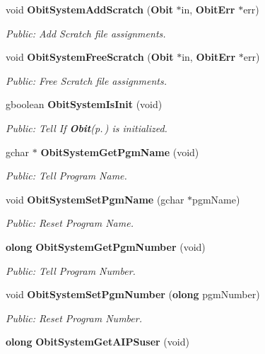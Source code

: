 \begin{CompactItemize}
void {\bf Obit\-System\-Add\-Scratch} ({\bf Obit} $\ast$in, {\bf Obit\-Err} $\ast$err)
\begin{CompactList}\small\item\em Public: Add Scratch file assignments. \item\end{CompactList}\item 
void {\bf Obit\-System\-Free\-Scratch} ({\bf Obit} $\ast$in, {\bf Obit\-Err} $\ast$err)
\begin{CompactList}\small\item\em Public: Free Scratch file assignments. \item\end{CompactList}\item 
gboolean {\bf Obit\-System\-Is\-Init} (void)
\begin{CompactList}\small\item\em Public: Tell If {\bf Obit}{\rm (p.\,\pageref{structObit})} is initialized. \item\end{CompactList}\item 
gchar $\ast$ {\bf Obit\-System\-Get\-Pgm\-Name} (void)
\begin{CompactList}\small\item\em Public: Tell Program Name. \item\end{CompactList}\item 
void {\bf Obit\-System\-Set\-Pgm\-Name} (gchar $\ast$pgm\-Name)
\begin{CompactList}\small\item\em Public: Reset Program Name. \item\end{CompactList}\item 
{\bf olong} {\bf Obit\-System\-Get\-Pgm\-Number} (void)
\begin{CompactList}\small\item\em Public: Tell Program Number. \item\end{CompactList}\item 
void {\bf Obit\-System\-Set\-Pgm\-Number} ({\bf olong} pgm\-Number)
\begin{CompactList}\small\item\em Public: Reset Program Number. \item\end{CompactList}\item 
{\bf olong} {\bf Obit\-System\-Get\-AIPSuser} (void)

\end{CompactItemize}
